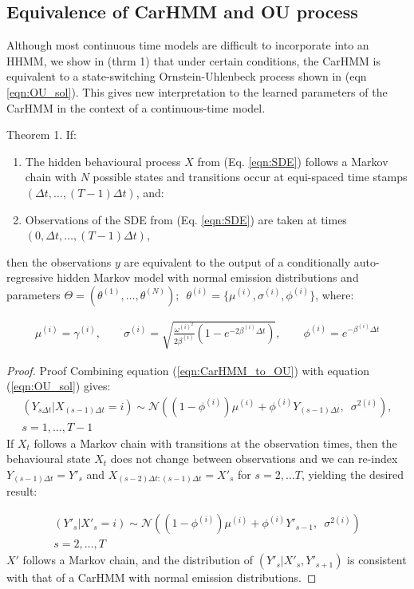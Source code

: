 \subsection{Equivalence of CarHMM and OU process}

Although most continuous time models are difficult to incorporate into an HHMM, we show in (thrm 1) that under certain conditions, the CarHMM is equivalent to a state-switching Ornstein-Uhlenbeck process shown in (eqn \ref{eqn:OU_sol}). This gives new interpretation to the learned parameters of the CarHMM in the context of a continuous-time model.

\begin{theorem}{Theorem 1.}{}%
If:
\begin{enumerate}
    \item The hidden behavioural process $X$ from (Eq. \ref{eqn:SDE}) follows a Markov chain with $N$ possible states and transitions occur at equi-spaced time stamps $\left(\Delta t, \ldots, (T-1)\Delta t\right)$, and:
    \item Observations of the SDE from (Eq. \ref{eqn:SDE}) are taken at times $\left(0, \Delta t, \ldots, (T-1)\Delta t\right)$,
\end{enumerate}
then the observations $y$ are equivalent to the output of a conditionally auto-regressive hidden Markov model with normal emission distributions and parameters $\Theta = (\theta^{(1)}, \ldots, \theta^{(N)}); \enspace \theta^{(i)} = \{\mu^{(i)},\sigma^{(i)},\phi^{(i)}\}$, where:

\begin{align}
\mu^{(i)} = \gamma^{(i)}, \qquad \sigma^{(i)} = \sqrt{\frac{\omega^{(i)^2}}{2\beta^{(i)}} (1-e^{-2\beta^{(i)}\Delta t})}, \qquad \phi^{(i)} = e^{-\beta^{(i)}\Delta t} \label{eqn:CarHMM_to_OU}
\end{align}

\end{theorem}

\begin{proof}{Proof}{}%
Combining equation (\ref{eqn:CarHMM_to_OU}) with equation (\ref{eqn:OU_sol}) gives:
%
\begin{align*}
\left(Y_{s \Delta t} | X_{(s-1)\Delta t} = i \right) \sim \mathcal{N}\left((1-\phi^{(i)}) \mu^{(i)} + \phi^{(i)} Y_{(s-1) \Delta t}, \enspace \sigma^{2(i)} \right),\\
s = 1, \ldots, T-1
\end{align*}
%
If $X_t$ follows a Markov chain with transitions at the observation times, then the behavioural state $X_t$ does not change between observations and we can re-index $Y_{(s-1) \Delta t} = Y'_s$ and $X_{(s-2)\Delta t: (s-1) \Delta t} = X'_s$ for $s = 2,\ldots T$, yielding the desired result:

\begin{align*}
\left(Y'_s| X'_s = i \right) \sim \mathcal{N}\left((1-\phi^{(i)}) \mu^{(i)} + \phi^{(i)} Y'_{s-1}, \enspace \sigma^{2(i)} \right)\\
s = 2, \ldots, T
\end{align*}
%
$X'$ follows a Markov chain, and the distribution of $(Y'_s|X'_s,Y'_{s+1})$ is consistent with that of a CarHMM with normal emission distributions.
\end{proof}


